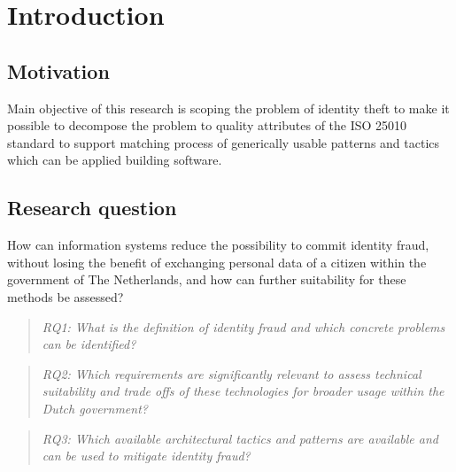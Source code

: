 \chapter{Introduction}\label{s:intro}


\section{Motivation}
Main objective of this research is scoping the problem of identity theft to make it possible to decompose the problem to quality attributes of the ISO 25010 standard to support matching process of generically usable patterns and tactics which can be applied building software.

\section{Research question}
How can information systems reduce the possibility to commit identity fraud, without losing the benefit of exchanging personal data of a citizen within the government of The Netherlands, and how can further suitability for these methods be assessed?

\begin{quote}\emph{RQ1: What is the definition of identity fraud and which concrete problems can be identified?}\end{quote}
\begin{quote}\emph{RQ2: Which requirements are significantly relevant to assess technical suitability and trade offs of these technologies for broader usage within the Dutch government?}\end{quote}
\begin{quote}\emph{RQ3: Which available architectural tactics and patterns are available and can be used to mitigate identity fraud?}\end{quote}

\break

